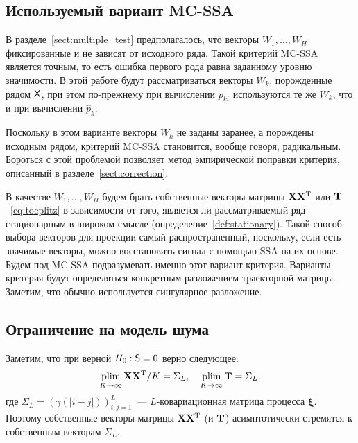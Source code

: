 \documentclass[specialist,
substylefile = spbu_report.rtx,
subf,12pt]{disser}
\theoremstyle{definition}
\newtheorem{remark}{Замечание}[chapter]
\begin{document}
\subsection{Используемый вариант MC-SSA}\label{sect:vectors_choise}
В разделе~\ref{sect:multiple_test} предполагалось, что векторы $W_1,\ldots, W_H$ фиксированные и не зависят от исходного ряда. Такой критерий MC-SSA является точным, то есть ошибка первого рода равна заданному уровню значимости. В этой работе будут рассматриваться векторы $W_k$, порожденные рядом $\mathsf{X}$, при этом по-прежнему при вычислении $p_{ki}$ используются те же $W_k$, что и при вычислении $\widehat p_k$.

Поскольку в этом варианте векторы $W_k$ не заданы заранее, а порождены исходным рядом, критерий MC-SSA становится, вообще говоря, радикальным. Бороться с этой проблемой позволяет метод эмпирической поправки критерия, описанный в разделе~\ref{sect:correction}.

В качестве $W_1, \ldots,W_H$ будем брать собственные векторы матрицы $\mathbf{X}\mathbf{X}^{\mathrm{T}}$ или $\mathbf{T}$~\eqref{eq:toeplitz} в зависимости от того, является ли рассматриваемый ряд стационарным в широком смысле (определение~\ref{def:stationary}). Такой способ выбора векторов для проекции самый распространенный, поскольку, если есть значимые векторы, можно восстановить сигнал с помощью SSA на их основе. Будем под MC-SSA подразумевать именно этот вариант критерия. Варианты критерия будут определяться конкретным разложением траекторной матрицы. Заметим, что обычно используется сингулярное разложение.

\subsection{Ограничение на модель шума}\label{sect:noise_constraint}

Заметим, что при верной $H_0:\mathsf{S}=0$ верно следующее:
\[
\operatorname*{plim}_{K\to\infty}\mathbf{X}\mathbf{X}^{\mathrm{T}} / K = \Sigma_L,\quad \operatorname*{plim}_{K\to\infty}\mathbf{T} = \Sigma_L.
\]
где $\Sigma_L=(\gamma(|i-j|))_{i,j=1}^L$~--- $L$-ковариационная матрица процесса $\bm\xi$. Поэтому собственные векторы матрицы $\mathbf{X}\mathbf{X}^{\mathrm{T}}$ (и $\mathbf{T}$) асимптотически стремятся к собственным векторам $\Sigma_L$.
\end{document}
